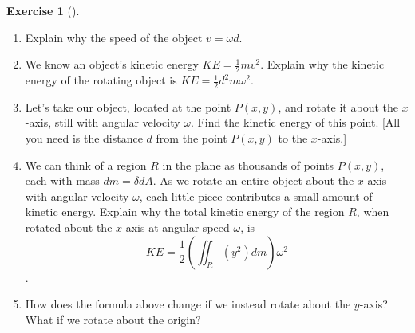 \documentclass[10pt,]{book}
\theoremstyle{plain}
\theoremstyle{definition}
\theoremstyle{definition}
\theoremstyle{definition}
\theoremstyle{definition}
\newtheorem{exploration}[project]{Exercise}
\theoremstyle{definition}
\numberwithin{equation}{section}
\begin{document}
\begin{exploration}[]\label{exploration-261}
\leavevmode%
\begin{enumerate}[font=\bfseries,label=(\alph*),ref=\alph*]
\item\label{task-709} Explain why the speed of the object \(v=\omega d\).%
\item\label{task-710} We know an object's kinetic energy \(KE=\frac{1}{2}mv^2\). Explain why the kinetic energy of the rotating object is \(KE = \frac{1}{2}d^2m\omega^2\).%
\item\label{task-711} Let's take our object, located at the point \(P(x,y)\), and rotate it about the \(x\)-axis, still with angular velocity \(\omega\). Find the kinetic energy of this point. [All you need is the distance \(d\) from the point \(P(x,y)\) to the \(x\)-axis.]%
\item\label{task-712} We can think of a region \(R\) in the plane as thousands of points \(P(x,y)\), each with mass \(dm=\delta dA\). As we rotate an entire object about the \(x\)-axis with angular velocity \(\omega\), each little piece contributes a small amount of kinetic energy. Explain why the total kinetic energy of the region \(R\), when rotated about the \(x\) axis at angular speed \(\omega\), is %
\begin{equation*}
KE= \frac{1}{2}\left(\iint_R (y^2)dm\right)\omega^2
\end{equation*}
.%
\item\label{task-713} How does the formula above change if we instead rotate about the \(y\)-axis? What if we rotate about the origin? %
\end{enumerate}
\end{exploration}
\typeout{************************************************}
\typeout{************************************************}
\end{document}
